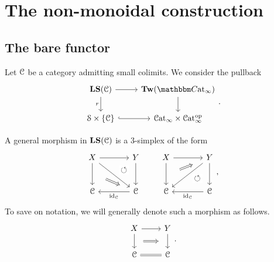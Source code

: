 \documentclass[main.tex]{subfiles}
\begin{document}
\section{The non-monoidal construction}
\label{sec:the_non_monoidal_construction}

\subsection{The bare functor}
\label{ssc:the_bare_functor}

Let $\mathcal{C}$ be a category admitting small colimits. We consider the pullback
\begin{equation*}
  \begin{tikzcd}
    \LS(\category{C})
    \arrow[r]
    \arrow[d, swap, "r"]
    & \Tw(\ICCat)
    \arrow[d]
    \\
    \S \times \{\category{C}\}
    \arrow[r, hook]
    & \ICat \times \ICat\op
  \end{tikzcd}.
\end{equation*}

A general morphism in $\mathbf{LS}(\mathcal{C})$ is a 3-simplex of the form
\begin{equation}
  \label{eq:general_morphism_of_local_systems_explicit}
  \begin{tikzcd}[column sep=large, row sep=large]
    X
    \arrow[r]
    \arrow[d, ""{name=L, right}]
    \arrow[dr]
    & Y
    \arrow[d, ""{name=R, left}]
    \arrow[from=l, to=R, phantom, near end, "\circlearrowleft"{description}]
    \\
    \category{C}
    & \category{C}
    \arrow[l, "\id_{\category{C}}"]
    \arrow[from=L, Rightarrow, shorten=3ex]
  \end{tikzcd}
  \qquad
  \begin{tikzcd}[column sep=large, row sep=large]
    X
    \arrow[r]
    \arrow[d, ""{name=L, right}]
    & Y
    \arrow[d, ""{name=R, left}]
    \arrow[dl]
    \\
    \category{C}
    \arrow[from=R, phantom, near start, "\circlearrowleft"{description}]
    & \category{C}
    \arrow[l, "\id_{\category{C}}"]
    \arrow[from=L, to=u, shorten=3ex, Rightarrow]
  \end{tikzcd},
\end{equation}
To save on notation, we will generally denote such a morphism as follows.
\begin{equation}
  \label{eq:general_morphism_of_local_systems_short}
  \begin{tikzcd}
    X
    \arrow[r]
    \arrow[d, ""{name=L, right}]
    & Y
    \arrow[d, ""{name=R, left}]
    \\
    \category{C}
    & \category{C}
    \arrow[l, equals]
    \arrow[Rightarrow, from=L, to=R, shorten=1.5ex]
  \end{tikzcd}.
\end{equation}
\end{document}
